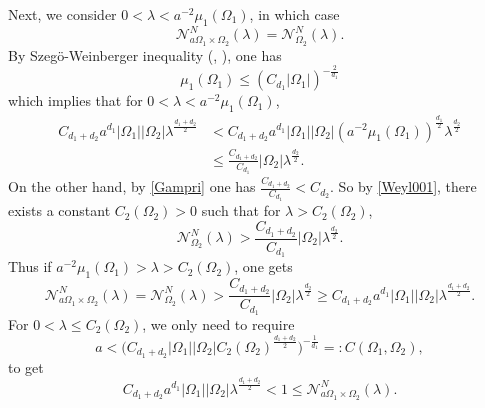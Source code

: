 \documentclass[11pt,letterpaper]{amsart}
\numberwithin{equation}{section}
\theoremstyle{plain}
\theoremstyle{plain}
\numberwithin{equation}{section}
\theoremstyle{remark}
\begin{document}
	Next, we consider   $0< \lambda< a^{-2} \mu_1(\Omega_1)$, in which case
	\[
	\mathcal N^N_{a\Omega_1\times \Omega_2}(\lambda)= \mathcal N^N_{\Omega_2}(\lambda).
	\]
	By Szeg\"{o}-Weinberger inequality (\cite{S54}, \cite{We}), one has
	\[
	\mu_1(\Omega_1)\le (C_{d_1}|\Omega_1|)^{-\frac{2}{d_1}}
	\]
	which implies that for $0< \lambda< a^{-2} \mu_1(\Omega_1)$, 
	\[
	\begin{aligned}
		C_{d_1+d_2}a^{d_1}|\Omega_1||\Omega_2|\lambda^{\frac{d_1+d_2}{2}}
		&< C_{d_1+d_2}a^{d_1}|\Omega_1||\Omega_2|(a^{-2} \mu_1(\Omega_1))^{\frac{d_1}{2}}\lambda^{\frac{d_2}{2}}\\
		&\le \frac{C_{d_1+d_2}}{C_{d_1}}|\Omega_2|\lambda^{\frac{d_2}{2}}.
	\end{aligned}
	\]
	On the other hand, 	by \eqref{Gampri}  one has $\frac{C_{d_1+d_2}}{C_{d_1}} < C_{d_2}$. So by \eqref{Weyl001}, there exists a constant $C_2(\Omega_2)>0$ such that for  $\lambda> C_2(\Omega_2)$,  
	\[
	\mathcal N^N_{\Omega_2}(\lambda)> \frac{C_{d_1+d_2}}{C_{d_1}}|\Omega_2|\lambda^{\frac{d_2}2}.
	\]
	Thus if $a^{-2} \mu_1(\Omega_1)> \lambda> C_2(\Omega_2)$, one gets
	\[
	\mathcal N^N_{a\Omega_1\times \Omega_2}(\lambda)= \mathcal N^N_{\Omega_2}(\lambda)> \frac{C_{d_1+d_2}}{C_{d_1}}|\Omega_2|\lambda^{\frac{d_2}{2}}\ge C_{d_1+d_2}a^{d_1}|\Omega_1||\Omega_2|\lambda^{\frac{d_1+d_2}{2}}.
	\]
	For $0< \lambda\le C_2(\Omega_2)$, we only need to require 
	\[
	a< \big(C_{d_1+d_2} |\Omega_1| |\Omega_2| C_2(\Omega_2)^{\frac{d_1+d_2}{2}}\big)^{-\frac{1}{d_1}}=: C(\Omega_1,\Omega_2),
	\]
	to get 
	\[
	C_{d_1+d_2}a^{d_1}|\Omega_1||\Omega_2|\lambda^{\frac{d_1+d_2}{2}} <1\le \mathcal N^N_{a\Omega_1\times \Omega_2}(\lambda).
	\]
	
\end{document}
